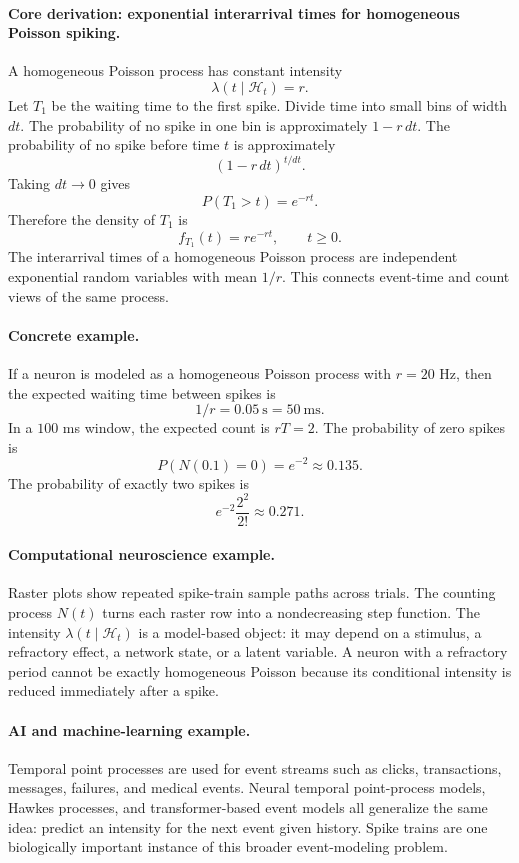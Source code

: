 \paragraph{Core derivation: exponential interarrival times for homogeneous Poisson spiking.}
A homogeneous Poisson process has constant intensity
\[
\lambda(t\mid\mathcal H_t)=r.
\]
Let \(T_1\) be the waiting time to the first spike. Divide time into small bins of width \(dt\). The probability of no spike in one bin is approximately \(1-r\,dt\). The probability of no spike before time \(t\) is approximately
\[
(1-r\,dt)^{t/dt}.
\]
Taking \(dt\to0\) gives
\[
P(T_1>t)=e^{-rt}.
\]
Therefore the density of \(T_1\) is
\[
f_{T_1}(t)=r e^{-rt},\qquad t\geq0.
\]
The interarrival times of a homogeneous Poisson process are independent exponential random variables with mean \(1/r\). This connects event-time and count views of the same process.

\paragraph{Concrete example.}
If a neuron is modeled as a homogeneous Poisson process with \(r=20\) Hz, then the expected waiting time between spikes is
\[
1/r=0.05\ \mathrm{s}=50\ \mathrm{ms}.
\]
In a \(100\) ms window, the expected count is \(rT=2\). The probability of zero spikes is
\[
P(N(0.1)=0)=e^{-2}\approx0.135.
\]
The probability of exactly two spikes is
\[
e^{-2}\frac{2^2}{2!}\approx0.271.
\]

\paragraph{Computational neuroscience example.}
Raster plots show repeated spike-train sample paths across trials. The counting process \(N(t)\) turns each raster row into a nondecreasing step function. The intensity \(\lambda(t\mid\mathcal H_t)\) is a model-based object: it may depend on a stimulus, a refractory effect, a network state, or a latent variable. A neuron with a refractory period cannot be exactly homogeneous Poisson because its conditional intensity is reduced immediately after a spike.

\paragraph{AI and machine-learning example.}
Temporal point processes are used for event streams such as clicks, transactions, messages, failures, and medical events. Neural temporal point-process models, Hawkes processes, and transformer-based event models all generalize the same idea: predict an intensity for the next event given history. Spike trains are one biologically important instance of this broader event-modeling problem.

